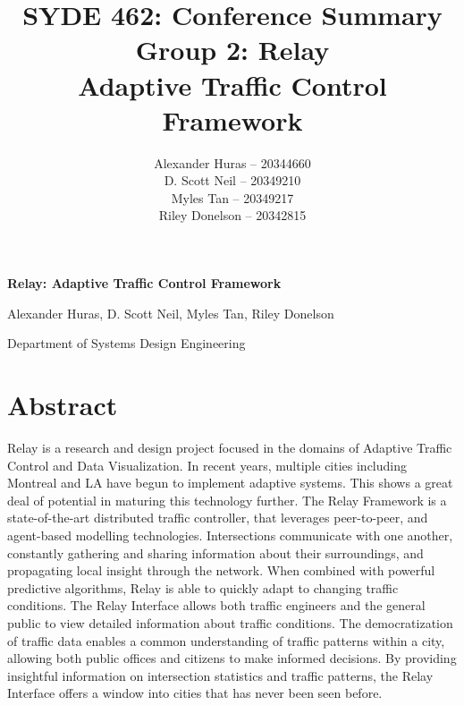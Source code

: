 \documentclass[a4paper,11pt]{report}
\author{  Alexander Huras -- 20344660\\
  D. Scott Neil -- 20349210\\
  Myles Tan -- 20349217\\
  Riley Donelson -- 20342815\\}
\title{SYDE 462: Conference Summary
\\Group 2: Relay \\
  Adaptive Traffic Control Framework}
\begin{document}
%

\centerline{  \bf \LARGE Relay: Adaptive Traffic Control Framework}
\centerline{Alexander Huras, D. Scott Neil, Myles Tan, Riley Donelson}
\centerline{Department of Systems Design Engineering}

\section{Abstract}
Relay is a research and design project focused in the domains of Adaptive Traffic Control and Data Visualization.
In recent years, multiple cities including Montreal and LA have begun to implement adaptive systems.
This shows a great deal of potential in maturing this technology further.
The Relay Framework is a state-of-the-art distributed traffic controller, that leverages peer-to-peer, and agent-based modelling technologies.
Intersections communicate with one another, constantly gathering and sharing information about their surroundings, and propagating local insight through the network.
When combined with powerful predictive algorithms, Relay is able to quickly adapt to changing traffic conditions.
The Relay Interface allows both traffic engineers and the general public to view detailed information about traffic conditions.
The democratization of traffic data enables a common understanding of traffic patterns within a city, allowing both public offices and citizens to make informed decisions.
By providing insightful information on intersection statistics and traffic patterns, the Relay Interface offers a window into cities that has never been seen before.
\end{document}
